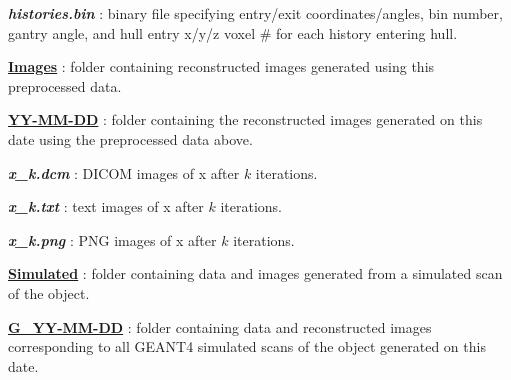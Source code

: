 \documentclass[landscape]{article}
\begin{document}
\begin{myEnumerate}[labelindent=0pt, leftmargin=*]
\begin{myEnumerate}[labelindent=1pt, leftmargin=*]
\begin{myEnumerate}[labelindent=1pt, leftmargin=*]
\begin{myEnumerate}[labelindent=1pt, leftmargin=*]
\begin{myEnumerate}[labelindent=1pt, leftmargin=*]
\begin{myEnumerate}[labelindent=1pt, leftmargin=*]
\begin{myEnumerate}[labelindent=1pt, leftmargin=*]
\begin{myEnumerate}[labelindent=1pt, leftmargin=*]
\begin{myEnumerate}[labelindent=1pt, leftmargin=*]
                                    \item \textbf{\textit{histories.bin}} : binary file specifying entry/exit coordinates/angles, bin number, gantry angle, and hull entry x/y/z voxel \# for each history entering hull.
                                    \item \ul{\textbf{Images}} : folder containing reconstructed images generated using this preprocessed data.
                                    \begin{myEnumerate}[labelindent=1pt, leftmargin=*]
                                        \item \ul{\textbf{YY-MM-DD}} : folder containing the reconstructed images generated on this date using the preprocessed data above.
                                            \begin{myEnumerate}[labelindent=1pt, leftmargin=*]
                                                \item \textbf{\textit{x\_k.dcm}} : DICOM images of x after $k$ iterations.
                                                \item \textbf{\textit{x\_k.txt}} : text images of x after $k$ iterations.
                                                \item \textbf{\textit{x\_k.png}} : PNG images of x after $k$ iterations.
                                            \end{myEnumerate}
                                    \end{myEnumerate}
                                \end{myEnumerate}
                            \end{myEnumerate}
                        \end{myEnumerate}
                    \end{myEnumerate}
                \end{myEnumerate}
            \end{myEnumerate}
        \end{myEnumerate}
        \item \ul{\textbf{Simulated}} : folder containing data and images generated from a simulated scan of the object.
        \begin{myEnumerate}[labelindent=1pt, leftmargin=*]
            \item \ul{\textbf{G\_YY-MM-DD}} : folder containing data and reconstructed images corresponding to all GEANT4 simulated scans of the object generated on this date.

\end{myEnumerate}
\end{myEnumerate}
\end{myEnumerate}
\end{document}
